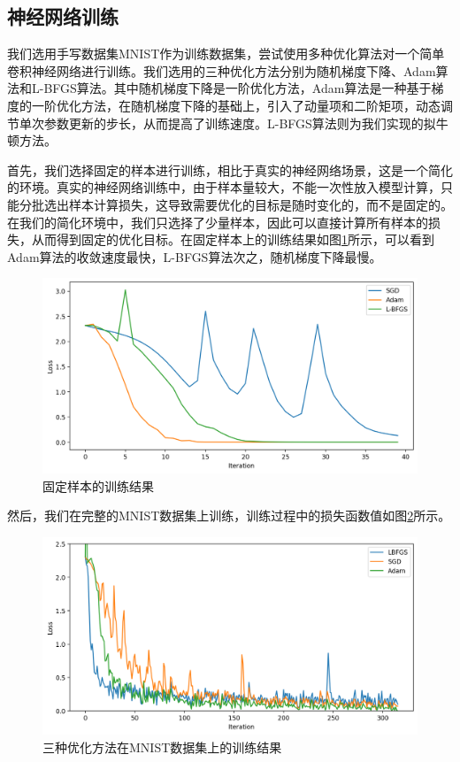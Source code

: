 \documentclass{article}
\begin{document}
\subsection{神经网络训练}

我们选用手写数据集MNIST作为训练数据集，尝试使用多种优化算法对一个简单卷积神经网络进行训练。我们选用的三种优化方法分别为随机梯度下降、Adam算法和L-BFGS算法。其中随机梯度下降是一阶优化方法，Adam算法是一种基于梯度的一阶优化方法，在随机梯度下降的基础上，引入了动量项和二阶矩项，动态调节单次参数更新的步长，从而提高了训练速度。L-BFGS算法则为我们实现的拟牛顿方法。

首先，我们选择固定的样本进行训练，相比于真实的神经网络场景，这是一个简化的环境。真实的神经网络训练中，由于样本量较大，不能一次性放入模型计算，只能分批选出样本计算损失，这导致需要优化的目标是随时变化的，而不是固定的。在我们的简化环境中，我们只选择了少量样本，因此可以直接计算所有样本的损失，从而得到固定的优化目标。在固定样本上的训练结果如图\ref{fig:mnist_fix_train}所示，可以看到Adam算法的收敛速度最快，L-BFGS算法次之，随机梯度下降最慢。

\begin{figure}
    \centering
    \includegraphics[width=0.8\linewidth]{fig-mnist-fix-train.png}
    \caption{固定样本的训练结果}
    \label{fig:mnist_fix_train}
\end{figure}

然后，我们在完整的MNIST数据集上训练，训练过程中的损失函数值如图\ref{fig:mnist_train}所示。

\begin{figure}
    \centering
    \includegraphics[width=0.9\linewidth]{fig-mnist-train.png}
    \caption{三种优化方法在MNIST数据集上的训练结果}
    \label{fig:mnist_train}
\end{figure}
\end{document}
